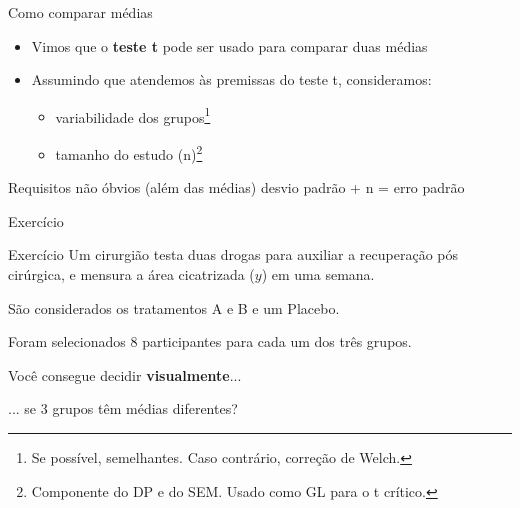 \documentclass{beamer}
\begin{document}
\begin{frame}[label=requisito]{Como comparar médias}
  \begin{itemize}
    \footnotesize
  \item Vimos que o {\bf teste t} pode ser usado para comparar duas médias
    \bigskip
  \item Assumindo que atendemos às premissas do teste t, consideramos:
    \begin{itemize}
      \footnotesize
    \item variabilidade dos grupos\footnote{\scriptsize Se possível, semelhantes. Caso contrário, correção de Welch.}
    \item tamanho do estudo (n)\footnote{\scriptsize Componente do DP e do SEM. Usado como GL para o t crítico.}
    \end{itemize}
  \end{itemize}
  \bigskip
  \begin{block}{Requisitos não óbvios (além das médias)}
    desvio padrão + n = erro padrão
  \end{block}
\end{frame}

\begin{frame}[label=exercicio-enunciado]{\small Exercício}
  \begin{exampleblock}{Exercício}
    \footnotesize
    Um cirurgião testa duas drogas para auxiliar a recuperação pós cirúrgica, e mensura a área cicatrizada ($y$) em uma semana.

    \bigskip
    São considerados os tratamentos A e B e um Placebo.

    \bigskip
    Foram selecionados 8 participantes para cada um dos três grupos.
  \end{exampleblock}
\end{frame}

\begin{frame}[label=ident-visual]
  \begin{center}
    \large
    Você consegue decidir {\bf visualmente}...

    \bigskip
    ... se 3 grupos têm médias diferentes?
  \end{center}
\end{frame}
\end{document}
